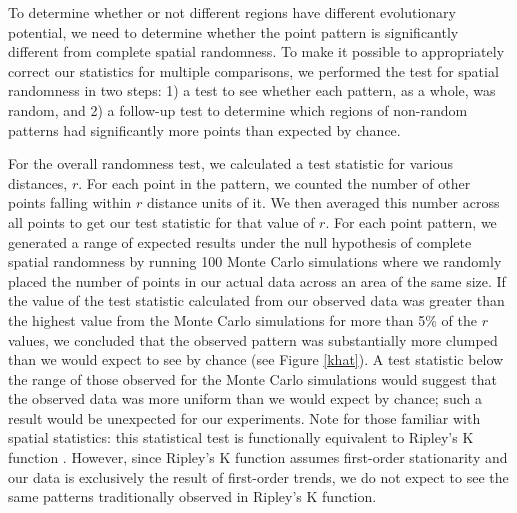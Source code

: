 To determine whether or not different regions have different evolutionary potential, we need to determine whether the point pattern is significantly different from complete spatial randomness. To make it possible to appropriately correct our statistics for multiple comparisons, we performed the test for spatial randomness in two steps: 1) a test to see whether each pattern, as a whole, was random, and 2) a follow-up test to determine which regions of non-random patterns had significantly more points than expected by chance. 

For the overall randomness test, we calculated a test statistic for various distances, $r$. For each point in the pattern, we counted the number of other points falling within $r$ distance units of it. We then averaged this number across all points to get our test statistic for that value of $r$. For each point pattern, we generated a range of expected results under the null hypothesis of complete spatial randomness by running 100 Monte Carlo simulations where we randomly placed the number of points in our actual data across an area of the same size. If the value of the test statistic calculated from our observed data was greater than the highest value from the Monte Carlo simulations for more than 5\% of the $r$ values, we concluded that the observed pattern was substantially more clumped than we would expect to see by chance (see Figure \ref{khat}). A test statistic below the range of those observed for the Monte Carlo simulations would suggest that the observed data was more uniform than we would expect by chance; such a result would be unexpected for our experiments. Note for those familiar with spatial statistics: this statistical test is functionally equivalent to Ripley's K function \citep{ripley_mapped_1981}. However, since Ripley's K function assumes first-order stationarity and our data is exclusively the result of first-order trends, we do not expect to see the same patterns traditionally observed in Ripley's K function.

